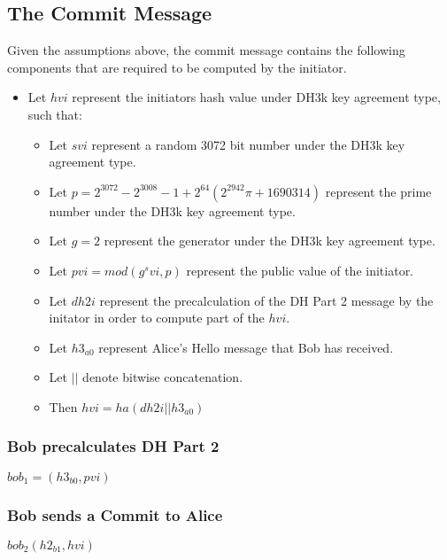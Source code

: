 \documentclass[11pt]{article}
\begin{document}
  \subsection{The Commit Message}
  Given the assumptions above, the commit message contains the following
  components that are required to be computed by the initiator.
  \begin{itemize}
    \item Let $hvi$ represent the initiators hash value under DH3k key
      agreement type, such that:
      \begin{itemize}
        \item Let $svi$ represent a random 3072 bit number under the DH3k key
              agreement type.
        \item Let $p = 2^{3072} - 2^3008 - 1 + 2^64(2^2942\pi + 1690314)$ represent
              the prime number under the DH3k key agreement type.
        \item Let $g = 2$ represent the generator under the DH3k key agreement
              type.
        \item Let $pvi = mod(g^svi, p)$ represent the public value of the
              initiator.
        \item Let $dh2i$ represent the precalculation of the DH Part 2 message
              by the initator in order to compute part of the $hvi$.
        \item Let $h3_{a0}$ represent Alice's Hello message that Bob has
              received.
        \item Let $||$ denote bitwise concatenation.
        \item Then $hvi = ha(dh2i||h3_{a0})$ 
      \end{itemize}
  \end{itemize}
  \subsubsection{Bob precalculates DH Part 2}
  $bob_1=(h3_{b0},pvi)$
  \subsubsection{Bob sends a Commit to Alice}
  $bob_2(h2_{b1},hvi)$
\end{document}
